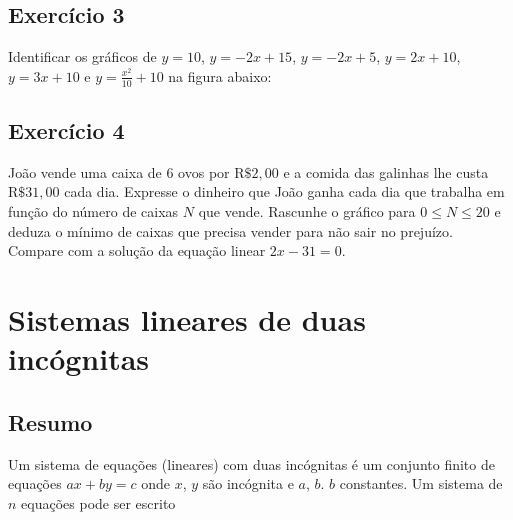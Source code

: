 \subsection*{Exercício 3}

Identificar os gráficos de
$y = 10$, $y=-2x+15$, $y=-2x+5$, $y=2x+10$, $y=3x+10$
e $y=\frac{x^2}{10} + 10$ na figura abaixo:

\begin{center}
\end{center}

\subsection*{Exercício 4}

João vende uma caixa de $6$ ovos por $\text{R\$}2,00$ e a comida das galinhas
lhe custa $\text{R\$}31,00$ cada dia. Expresse o dinheiro que João ganha cada
dia que trabalha em função do número de caixas $N$ que vende. Rascunhe o gráfico
para $0 \leq N \leq 20$ e deduza o mínimo de caixas que precisa vender para não
sair no prejuízo. Compare com a solução da equação linear $2x - 31 = 0$.

\section{Sistemas lineares de duas incógnitas}

\subsection*{Resumo}

Um sistema de equações (lineares) com duas incógnitas é um conjunto finito de
equações $a x + b y = c$ onde $x$, $y$ são incógnita e $a$, $b$. $b$ constantes.
Um sistema de $n$ equações pode ser escrito

